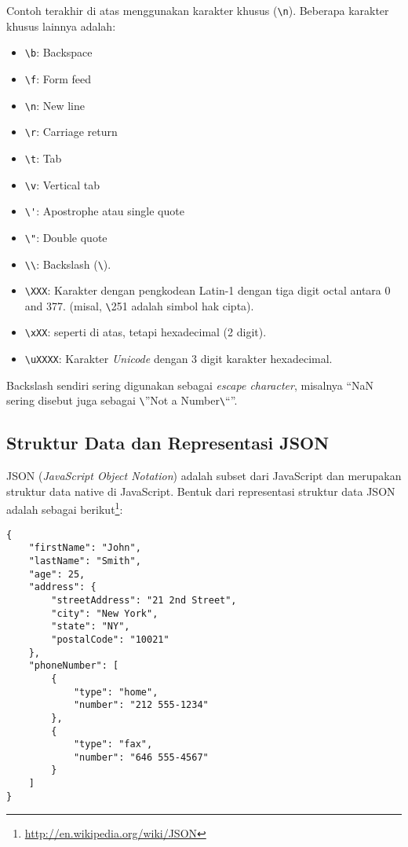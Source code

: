 Contoh terakhir di atas menggunakan karakter khusus (\verb+\n+). Beberapa karakter khusus lainnya adalah:

\begin{itemize}
  \item \verb+\b+: Backspace
  \item \verb+\f+: Form feed
  \item \verb+\n+: New line
  \item \verb+\r+: Carriage return
  \item \verb+\t+: Tab
  \item \verb+\v+: Vertical tab
  \item \verb+\'+: Apostrophe atau single quote
  \item \verb+\"+: Double quote
  \item \verb+\\+:	Backslash (\verb+\+).
  \item \verb+\XXX+: Karakter dengan pengkodean Latin-1 dengan tiga digit octal antara 0 and 377. (misal, \verb+\+251 adalah simbol hak cipta).
  \item \verb+\xXX+: seperti di atas, tetapi hexadecimal (2 digit).
  \item \verb+\uXXXX+: Karakter \textit{Unicode} dengan 3 digit karakter hexadecimal.
\end{itemize}

Backslash sendiri sering digunakan sebagai \textit{escape character}, misalnya ``NaN sering disebut juga sebagai \verb+\+''Not a Number\verb+\+``''.

\subsection{Struktur Data dan Representasi JSON}

JSON (\textit{JavaScript Object Notation}) adalah subset dari JavaScript dan merupakan struktur data native di JavaScript. Bentuk dari representasi struktur data JSON adalah sebagai berikut\footnote{\url{http://en.wikipedia.org/wiki/JSON}}:

\begin{lstlisting}
{
    "firstName": "John",
    "lastName": "Smith",
    "age": 25,
    "address": {
        "streetAddress": "21 2nd Street",
        "city": "New York",
        "state": "NY",
        "postalCode": "10021"
    },
    "phoneNumber": [
        {
            "type": "home",
            "number": "212 555-1234"
        },
        {
            "type": "fax",
            "number": "646 555-4567"
        }
    ]
}
\end{lstlisting}

